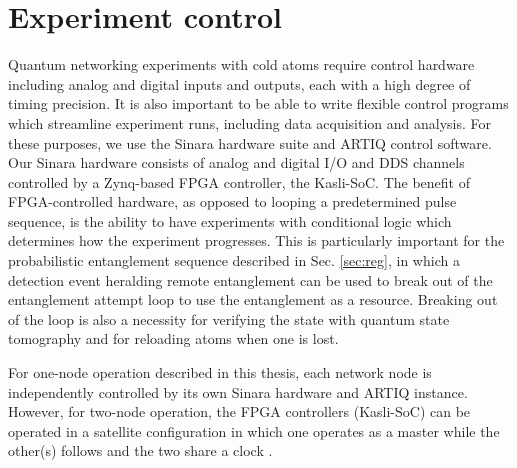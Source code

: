 \section{Experiment control}

Quantum networking experiments with cold atoms require control hardware including analog and digital inputs and outputs, each with a high degree of timing precision. It is also important to be able to write flexible control programs which streamline experiment runs, including data acquisition and analysis. For these purposes, we use the Sinara hardware suite and ARTIQ control software. Our Sinara hardware consists of analog and digital I/O and DDS channels controlled by a Zynq-based FPGA controller, the Kasli-SoC\cite{lam2021combining}. The benefit of FPGA-controlled hardware, as opposed to looping a predetermined pulse sequence, is the ability to have experiments with conditional logic which determines how the experiment progresses. This is particularly important for the probabilistic entanglement sequence described in Sec. \ref{sec:reg}, in which a detection event heralding remote entanglement can be used to break out of the entanglement attempt loop to use the entanglement as a resource. Breaking out of the loop is also a necessity for verifying the state with quantum state tomography and for reloading atoms when one is lost.

For one-node operation described in this thesis, each network node is independently controlled by its own Sinara hardware and ARTIQ instance. However, for two-node operation, the FPGA controllers (Kasli-SoC) can be operated in a satellite configuration in which one operates as a master while the other(s) follows and the two share a clock \cite{Stephenson2020}. 

